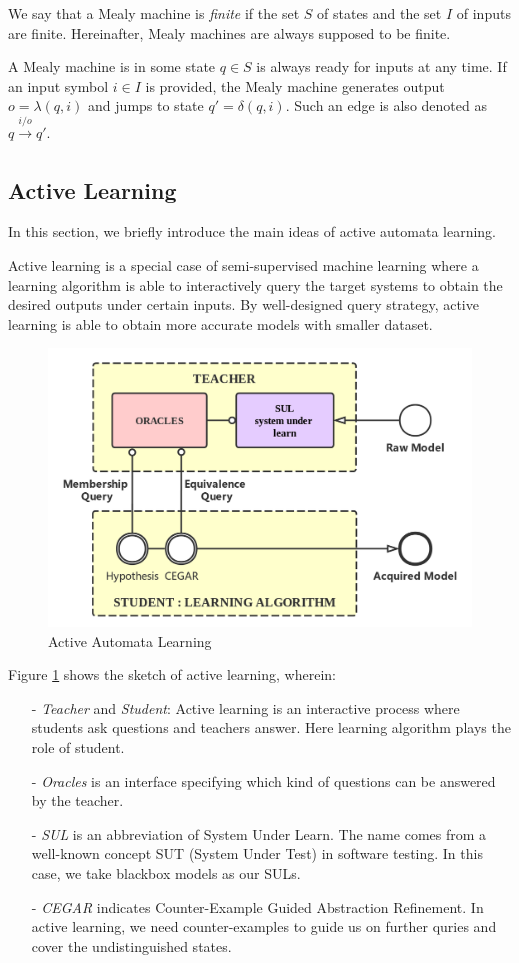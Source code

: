 \documentclass[conference, a4paper]{IEEEtran}
\begin{document}
We say that a Mealy machine is \emph{finite} if the set $S$ of states and the set $I$ of inputs are
finite. Hereinafter, Mealy machines are always supposed to be finite.

A Mealy machine is in some state $q\in S$ is always ready for inputs at any time. If an input symbol
$i\in I$ is provided, the Mealy machine generates output $o=\lambda(q,i)$ and jumps to state
$q'=\delta(q,i)$. Such an edge is also denoted as $q\xrightarrow[]{i/o}q'$.


\subsection{Active Learning}
In this section, we briefly introduce the main ideas of active automata learning. 

Active learning \cite{settles2010active} is a special case of semi-supervised machine learning where
a learning algorithm is able to interactively query the target systems to obtain the desired outputs
under certain inputs. By well-designed query strategy, active learning is able to obtain more
accurate models with smaller dataset. 

\begin{figure}[ht]
  \begin{center}
    \includegraphics[width=.5\textwidth]{./images/activelearning.png}
  \end{center}
  \caption{Active Automata Learning}
  \label{fig:activelearning}
\end{figure}

Figure \ref{fig:activelearning} shows the sketch of active learning, wherein:
\begin{itemize}
  \item[-] \emph{Teacher} and \emph{Student}: Active learning is an interactive process where
    students ask questions and teachers answer. Here learning algorithm plays the role of student.
  \item[-] \emph{Oracles} is an interface specifying which kind of questions can be answered by the
    teacher.
  \item[-] \emph{SUL} is an abbreviation of System Under Learn. The name comes from a well-known
    concept SUT (System Under Test) in software testing. In this case, we take blackbox models as our
    SULs.
  \item[-] \emph{CEGAR} indicates Counter-Example Guided Abstraction
    Refinement\cite{DBLP:conf/cav/ClarkeGJLV00}. In active learning, we need counter-examples to
    guide us on further quries and cover the undistinguished states.
\end{itemize}
\end{document}
